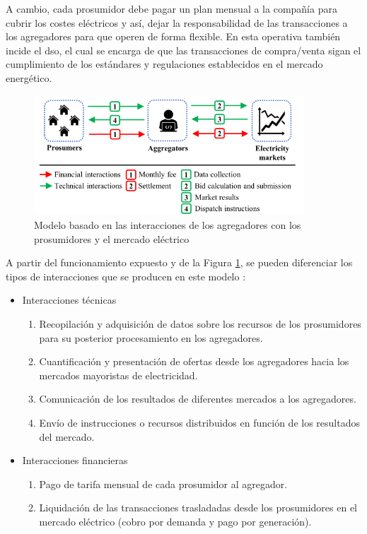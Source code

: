 \vspace{3mm}

A cambio, cada prosumidor debe pagar un plan mensual a la compañía para cubrir los costes eléctricos y así, dejar la responsabilidad de las transacciones a los agregadores para que operen de forma flexible. En esta operativa también incide el \gls{dso}, el cual se encarga de que las transacciones de compra/venta sigan el cumplimiento de los estándares y regulaciones establecidos en el mercado energético. 
\vspace{3mm}

\begin{figure}[h!]
  \centering
  \includegraphics[width=0.9\textwidth]{img/teoria/market.png}
  \caption{Modelo basado en las interacciones de los agregadores con los prosumidores y el mercado eléctrico \cite{business}}
  \label{fig:market}
\end{figure}

\vspace{3mm}

A partir del funcionamiento expuesto y de la Figura \ref{fig:market}, se pueden diferenciar los tipos de interacciones que se producen en este modelo \cite{business}:

\begin{itemize}
  \item Interacciones técnicas 
    \begin{enumerate}
      \item Recopilación y adquisición de datos sobre los recursos de los prosumidores para su posterior procesamiento en los agregadores.  
      \item Cuantificación y presentación de ofertas desde los agregadores hacia los mercados mayoristas de electricidad.
      \item Comunicación de los resultados de diferentes mercados a los agregadores.
      \item Envío de instrucciones o recursos distribuidos en función de los resultados del mercado.      
    \end{enumerate}

  \item Interacciones financieras
  \begin{enumerate}
    \item Pago de tarifa mensual de cada prosumidor al agregador.
    \item Liquidación de las transacciones trasladadas desde los prosumidores en el mercado eléctrico (cobro por demanda y pago por generación).    
  \end{enumerate}
\end{itemize}


